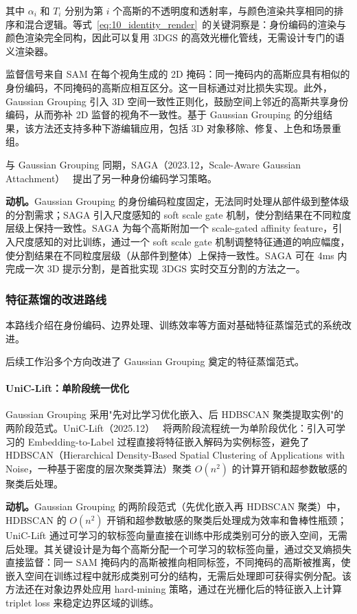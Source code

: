 其中 $\alpha_i$ 和 $T_i$ 分别为第 $i$ 个高斯的不透明度和透射率，与颜色渲染共享相同的排序和混合逻辑。等式~\ref{eq:10_identity_render}~的关键洞察是：身份编码的渲染与颜色渲染完全同构，因此可以复用 3DGS 的高效光栅化管线，无需设计专门的语义渲染器。

监督信号来自 SAM 在每个视角生成的 2D 掩码：同一掩码内的高斯应具有相似的身份编码，不同掩码的高斯应相互区分。这一目标通过对比损失实现。此外，Gaussian Grouping 引入 3D 空间一致性正则化，鼓励空间上邻近的高斯共享身份编码，从而弥补 2D 监督的视角不一致性。基于 Gaussian Grouping 的分组结果，该方法还支持多种下游编辑应用，包括 3D 对象移除、修复、上色和场景重组。

与 Gaussian Grouping 同期，SAGA（2023.12，Scale-Aware Gaussian Attachment）~\cite{2312_00860} 提出了另一种身份编码学习策略。

\textbf{动机。}Gaussian Grouping 的身份编码粒度固定，无法同时处理从部件级到整体级的分割需求；SAGA 引入尺度感知的 soft scale gate 机制，使分割结果在不同粒度层级上保持一致性。SAGA 为每个高斯附加一个 scale-gated affinity feature，引入尺度感知的对比训练，通过一个 soft scale gate 机制调整特征通道的响应幅度，使分割结果在不同粒度层级（从部件到整体）上保持一致性。SAGA 可在 4ms 内完成一次 3D 提示分割，是首批实现 3DGS 实时交互分割的方法之一。

\subsubsection{特征蒸馏的改进路线}

本路线介绍在身份编码、边界处理、训练效率等方面对基础特征蒸馏范式的系统改进。

后续工作沿多个方向改进了 Gaussian Grouping 奠定的特征蒸馏范式。

\paragraph{UniC-Lift：单阶段统一优化} Gaussian Grouping 采用"先对比学习优化嵌入、后 HDBSCAN 聚类提取实例"的两阶段范式。UniC-Lift（2025.12）~\cite{2512_24763} 将两阶段流程统一为单阶段优化：引入可学习的 Embedding-to-Label 过程直接将特征嵌入解码为实例标签，避免了 HDBSCAN（Hierarchical Density-Based Spatial Clustering of Applications with Noise，一种基于密度的层次聚类算法）聚类 $O(n^2)$ 的计算开销和超参数敏感的聚类后处理。

\textbf{动机。}Gaussian Grouping 的两阶段范式（先优化嵌入再 HDBSCAN 聚类）中，HDBSCAN 的 $O(n^2)$ 开销和超参数敏感的聚类后处理成为效率和鲁棒性瓶颈；UniC-Lift 通过可学习的软标签向量直接在训练中形成类别可分的嵌入空间，无需后处理。其关键设计是为每个高斯分配一个可学习的软标签向量，通过交叉熵损失直接监督：同一 SAM 掩码内的高斯被推向相同标签，不同掩码的高斯被推离，使嵌入空间在训练过程中就形成类别可分的结构，无需后处理即可获得实例分配。该方法还在对象边界处应用 hard-mining 策略，通过在光栅化后的特征嵌入上计算 triplet loss 来稳定边界区域的训练。

